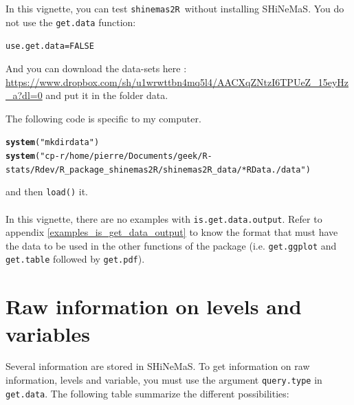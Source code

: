 \documentclass{article}\usepackage[]{graphicx}\usepackage[]{color}
\makeatletter
\newcommand{\hlnum}[1]{\textcolor[rgb]{0.686,0.059,0.569}{#1}}%
\newcommand{\hlstr}[1]{\textcolor[rgb]{0.192,0.494,0.8}{#1}}%
\newcommand{\hlstd}[1]{\textcolor[rgb]{0.345,0.345,0.345}{#1}}%
\newcommand{\hlkwb}[1]{\textcolor[rgb]{0.69,0.353,0.396}{#1}}%
\newcommand{\hlkwd}[1]{\textcolor[rgb]{0.737,0.353,0.396}{\textbf{#1}}}%
\newenvironment{kframe}{%
 \def\at@end@of@kframe{}%
 \ifinner\ifhmode%
  \def\at@end@of@kframe{\end{minipage}}%
  \begin{minipage}{\columnwidth}%
 \fi\fi%
 \def\FrameCommand##1{\hskip\@totalleftmargin \hskip-\fboxsep
 \colorbox{shadecolor}{##1}\hskip-\fboxsep
     \hskip-\linewidth \hskip-\@totalleftmargin \hskip\columnwidth}%
 \MakeFramed {\advance\hsize-\width
   \@totalleftmargin\z@ \linewidth\hsize
   \@setminipage}}%
 {\par\unskip\endMakeFramed%
 \at@end@of@kframe}
\newenvironment{knitrout}{}{} %
\newcommand{\BD}{SHiNeMaS}
\newcommand{\pack}{\texttt{shinemas2R}}
\makeatother
\begin{document}
In this vignette, you can test \pack~without installing \BD.
You do not use the \texttt{get.data} function:
\begin{knitrout}
\color{fgcolor}\begin{kframe}
\begin{alltt}
\hlstd{use.get.data} \hlkwb{=} \hlnum{FALSE}
\end{alltt}
\end{kframe}
\end{knitrout}

And you can download the data-sets here : \url{https://www.dropbox.com/sh/u1wrwttbn4mq5l4/AACXqZNtzI6TPUeZ_15eyHz_a?dl=0} and put it in the folder data.

The following code is specific to my computer.
\begin{knitrout}
\color{fgcolor}\begin{kframe}
\begin{alltt}
\hlkwd{system}\hlstd{(}\hlstr{"mkdir data"}\hlstd{)}
\hlkwd{system}\hlstd{(}\hlstr{"cp -r /home/pierre/Documents/geek/R-stats/Rdev/R_package_shinemas2R/shinemas2R_data/*RData ./data"}\hlstd{)}
\end{alltt}
\end{kframe}
\end{knitrout}

and then \texttt{load()} it.\\

~\\

In this vignette, there are no examples with \texttt{is.get.data.output}.
Refer to appendix \ref{examples_is_get_data_output} to know the format that must have the data to be used in the other functions of the package (i.e. \texttt{get.ggplot} and \texttt{get.table} followed by \texttt{get.pdf}).






\newpage


\section{Raw information on levels and variables}
\label{raw}

Several information are stored in \BD.
To get information on raw information, levels and variable, you must use the argument \texttt{query.type} in \texttt{get.data}.
The following table summarize the different possibilities:
\end{document}
